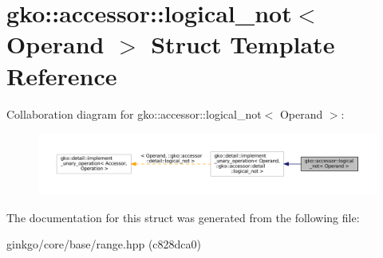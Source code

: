 \hypertarget{structgko_1_1accessor_1_1logical__not}{}\section{gko\+:\+:accessor\+:\+:logical\+\_\+not$<$ Operand $>$ Struct Template Reference}
\label{structgko_1_1accessor_1_1logical__not}


Collaboration diagram for gko\+:\+:accessor\+:\+:logical\+\_\+not$<$ Operand $>$\+:
\nopagebreak
\begin{figure}[H]
\begin{center}
\leavevmode
\includegraphics[width=350pt]{structgko_1_1accessor_1_1logical__not__coll__graph}
\end{center}
\end{figure}


The documentation for this struct was generated from the following file\+:\begin{DoxyCompactItemize}
\item 
ginkgo/core/base/range.\+hpp (c828dca0)\end{DoxyCompactItemize}
